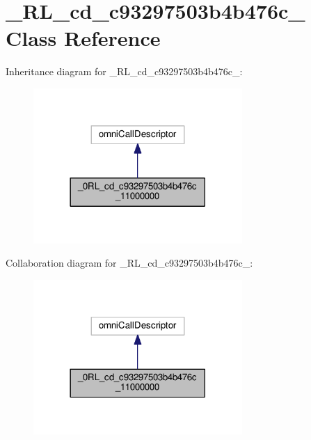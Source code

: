\hypertarget{class__0_r_l__cd__c93297503b4b476c__11000000}{}\section{\+\_\+R\+L\+\_\+cd\+\_\+c93297503b4b476c\+\_ Class Reference}
\label{class__0_r_l__cd__c93297503b4b476c__11000000}


Inheritance diagram for \+\_\+R\+L\+\_\+cd\+\_\+c93297503b4b476c\+\_\+:
\nopagebreak
\begin{figure}[H]
\begin{center}
\leavevmode
\includegraphics[width=225pt]{class__0_r_l__cd__c93297503b4b476c__11000000__inherit__graph}
\end{center}
\end{figure}


Collaboration diagram for \+\_\+R\+L\+\_\+cd\+\_\+c93297503b4b476c\+\_\+:
\nopagebreak
\begin{figure}[H]
\begin{center}
\leavevmode
\includegraphics[width=225pt]{class__0_r_l__cd__c93297503b4b476c__11000000__coll__graph}
\end{center}
\end{figure}
